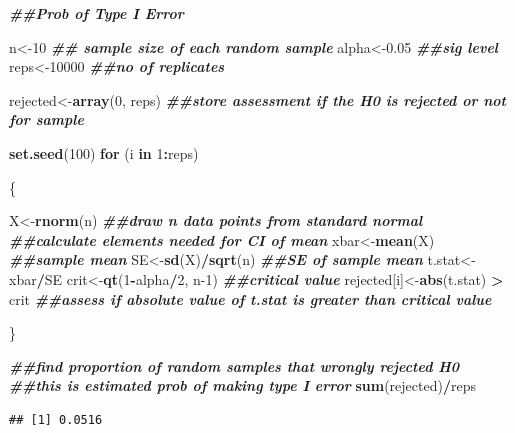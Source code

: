 \documentclass[
]{book}
\newenvironment{Shaded}{\begin{snugshade}}{\end{snugshade}}
\newcommand{\ControlFlowTok}[1]{\textcolor[rgb]{0.13,0.29,0.53}{\textbf{#1}}}
\newcommand{\DecValTok}[1]{\textcolor[rgb]{0.00,0.00,0.81}{#1}}
\newcommand{\DocumentationTok}[1]{\textcolor[rgb]{0.56,0.35,0.01}{\textbf{\textit{#1}}}}
\newcommand{\FloatTok}[1]{\textcolor[rgb]{0.00,0.00,0.81}{#1}}
\newcommand{\FunctionTok}[1]{\textcolor[rgb]{0.13,0.29,0.53}{\textbf{#1}}}
\newcommand{\NormalTok}[1]{#1}
\newcommand{\OtherTok}[1]{\textcolor[rgb]{0.56,0.35,0.01}{#1}}
\newcommand{\SpecialCharTok}[1]{\textcolor[rgb]{0.81,0.36,0.00}{\textbf{#1}}}
\begin{document}
\begin{Shaded}
\begin{Highlighting}[]
\DocumentationTok{\#\#Prob of Type I Error }

\NormalTok{n}\OtherTok{\textless{}{-}}\DecValTok{10} \DocumentationTok{\#\# sample size of each random sample}
\NormalTok{alpha}\OtherTok{\textless{}{-}}\FloatTok{0.05} \DocumentationTok{\#\#sig level}
\NormalTok{reps}\OtherTok{\textless{}{-}}\DecValTok{10000} \DocumentationTok{\#\#no of replicates}

\NormalTok{rejected}\OtherTok{\textless{}{-}}\FunctionTok{array}\NormalTok{(}\DecValTok{0}\NormalTok{, reps) }\DocumentationTok{\#\#store assessment if the H0 is rejected or not for sample}

\FunctionTok{set.seed}\NormalTok{(}\DecValTok{100}\NormalTok{)}
\ControlFlowTok{for}\NormalTok{ (i }\ControlFlowTok{in} \DecValTok{1}\SpecialCharTok{:}\NormalTok{reps)}
  
\NormalTok{\{}
  
\NormalTok{  X}\OtherTok{\textless{}{-}}\FunctionTok{rnorm}\NormalTok{(n) }\DocumentationTok{\#\#draw n data points from standard normal}
  \DocumentationTok{\#\#calculate elements needed for CI of mean}
\NormalTok{  xbar}\OtherTok{\textless{}{-}}\FunctionTok{mean}\NormalTok{(X) }\DocumentationTok{\#\#sample mean}
\NormalTok{  SE}\OtherTok{\textless{}{-}}\FunctionTok{sd}\NormalTok{(X)}\SpecialCharTok{/}\FunctionTok{sqrt}\NormalTok{(n) }\DocumentationTok{\#\#SE of sample mean}
\NormalTok{  t.stat}\OtherTok{\textless{}{-}}\NormalTok{xbar}\SpecialCharTok{/}\NormalTok{SE}
\NormalTok{  crit}\OtherTok{\textless{}{-}}\FunctionTok{qt}\NormalTok{(}\DecValTok{1}\SpecialCharTok{{-}}\NormalTok{alpha}\SpecialCharTok{/}\DecValTok{2}\NormalTok{, n}\DecValTok{{-}1}\NormalTok{) }\DocumentationTok{\#\#critical value}
\NormalTok{  rejected[i]}\OtherTok{\textless{}{-}}\FunctionTok{abs}\NormalTok{(t.stat) }\SpecialCharTok{\textgreater{}}\NormalTok{ crit }\DocumentationTok{\#\#assess if absolute value of t.stat is greater than critical value}
  
\NormalTok{\}}

\DocumentationTok{\#\#find proportion of random samples that wrongly rejected H0}
\DocumentationTok{\#\#this is estimated prob of making type I error}
\FunctionTok{sum}\NormalTok{(rejected)}\SpecialCharTok{/}\NormalTok{reps }
\end{Highlighting}
\end{Shaded}

\begin{verbatim}
## [1] 0.0516
\end{verbatim}
\end{document}
